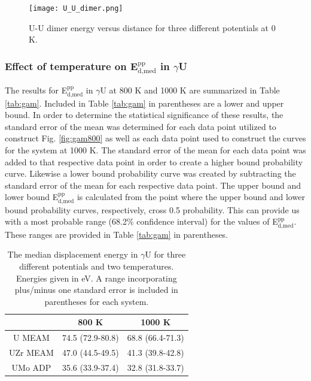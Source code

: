 \documentclass[review]{elsarticle}
\begin{document}
\begin{figure}[h]
 \centering
 \texttt{[image: U\_U\_dimer.png]} 
 \caption{U-U dimer energy versus distance for three different potentials at 0 K.}
 \label{fig:dimer}
\end{figure}

\subsubsection{Effect of temperature on E$^{\textrm{pp}}_{\textrm{d,med}}$ in $\gamma$U}

The results for E$^{\textrm{pp}}_{\textrm{d,med}}$ in $\gamma$U at 800 K and 1000 K are summarized in Table \ref{tab:gam}. Included in Table \ref{tab:gam} in parentheses are a lower and upper bound. In order to determine the statistical significance of these results, the standard error of the mean was determined for each data point utilized to construct Fig. \ref{fig:gam800} as well as each data point used to construct the curves for the system at 1000 K. The standard error of the mean for each data point was added to that respective data point in order to create a higher bound probability curve. Likewise a lower bound probability curve was created by subtracting the standard error of the mean for each respective data point. The upper bound and lower bound E$^{\textrm{pp}}_{\textrm{d,med}}$ is calculated from the point where the upper bound and lower bound probability curves, respectively, cross 0.5 probability. This can provide us with a most probable range (68.2\% confidence interval) for the values of E$^{\textrm{pp}}_{\textrm{d,med}}$. These ranges are provided in Table \ref{tab:gam} in parentheses. 

\begin{table}[h]
\caption{The median displacement energy in $\gamma$U for three different potentials and two temperatures. Energies given in eV. A range incorporating plus/minus one standard error is included in parentheses for each system.} \label{tab:gam}
\begin{center}
\begin{tabular}{|c|c|c|}
	\hline
	& 800 K & 1000 K \\
	 \hline
	 U MEAM & 74.5 (72.9-80.8) & 68.8 (66.4-71.3) \\
	 UZr MEAM & 47.0 (44.5-49.5) & 41.3 (39.8-42.8) \\
	 UMo ADP & 35.6 (33.9-37.4) & 32.8 (31.8-33.7) \\
	 \hline
\end{tabular}
\end{center}
\label{default}
\end{table}
\end{document}
